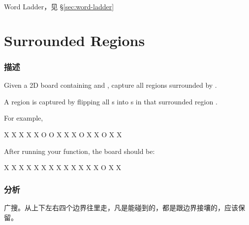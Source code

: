 \begindot
\item Word Ladder，见 \S \ref{sec:word-ladder}
\myenddot


\section{Surrounded Regions} %
\label{sec:surrounded-regions}


\subsubsection{描述}
Given a 2D board containing  and , capture all regions surrounded by .

A region is captured by flipping all s into s in that surrounded region .

For example,
\begin{Code}
X X X X
X O O X
X X O X
X O X X
\end{Code}

After running your function, the board should be:
\begin{Code}
X X X X
X X X X
X X X X
X O X X
\end{Code}


\subsubsection{分析}
广搜。从上下左右四个边界往里走，凡是能碰到的，都是跟边界接壤的，应该保留。


